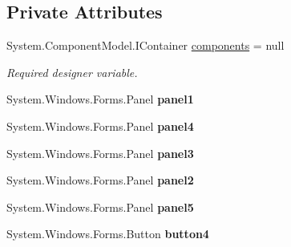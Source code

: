 \subsection*{Private Attributes}
\begin{DoxyCompactItemize}
\item 
System.\+Component\+Model.\+I\+Container \mbox{\hyperlink{class_quiz___matematyczny_1_1_strona_startowa_ad43f87d86fc5620cb8e6bf37550472aa}{components}} = null
\begin{DoxyCompactList}\small\item\em Required designer variable. \end{DoxyCompactList}\item 
\mbox{\label{class_quiz___matematyczny_1_1_strona_startowa_a4c486a819b5228aa1bfa992e55a1d321}} 
System.\+Windows.\+Forms.\+Panel {\bfseries panel1}
\item 
\mbox{\label{class_quiz___matematyczny_1_1_strona_startowa_a98a7091c8af5d5ac8487a11d34265527}} 
System.\+Windows.\+Forms.\+Panel {\bfseries panel4}
\item 
\mbox{\label{class_quiz___matematyczny_1_1_strona_startowa_a1c77c364214984e85c8a7b91f0b803c6}} 
System.\+Windows.\+Forms.\+Panel {\bfseries panel3}
\item 
\mbox{\label{class_quiz___matematyczny_1_1_strona_startowa_aec80fb32f98a89cd674e4d90430a1595}} 
System.\+Windows.\+Forms.\+Panel {\bfseries panel2}
\item 
\mbox{\label{class_quiz___matematyczny_1_1_strona_startowa_a8dbcc6754bb86e987ebf5f63e391091d}} 
System.\+Windows.\+Forms.\+Panel {\bfseries panel5}
\item 
\mbox{\label{class_quiz___matematyczny_1_1_strona_startowa_a20de6efb789e2fd72c9550225c1ddfe2}} 
System.\+Windows.\+Forms.\+Button {\bfseries button4}
\item 
\mbox{\label{class_quiz___matematyczny_1_1_strona_startowa_a2fd9204aa9d62a5401c3279a19f3476b}} 

\end{DoxyCompactItemize}
